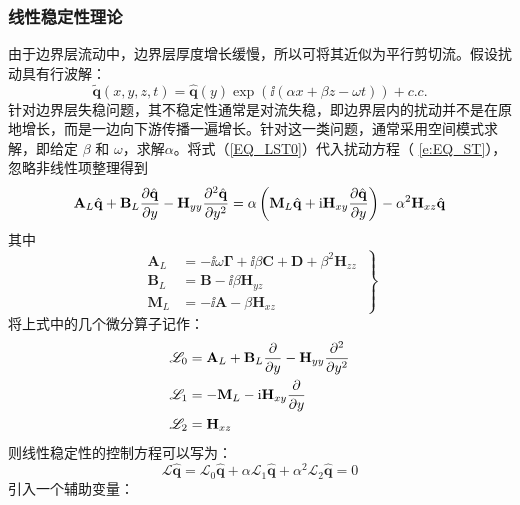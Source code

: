 \subsubsection{线性稳定性理论}
由于边界层流动中，边界层厚度增长缓慢，所以可将其近似为平行剪切流。假设扰动具有行波解：
\begin{equation}\label{EQ_LST0}
    \tilde{\mathbf{q}}(x,y,z,t)=
    \hat{\mathbf{q}}(y)\exp\left(\ii (\alpha x+\beta z-\omega t)\right)+c.c.
\end{equation}
针对边界层失稳问题，其不稳定性通常是对流失稳，即边界层内的扰动并不是在原地增长，而是一边向下游传播一遍增长。针对这一类问题，通常采用空间模式求解，即给定 $\beta$ 和 $\omega$，求解$\alpha$。将式（\ref{EQ_LST0}）代入扰动方程（ \ref{e:EQ_ST}）， 忽略非线性项整理得到
\begin{equation}\label{EQ_LST1}
\mathbf{A}_L\hat{\mathbf{q}}+
\mathbf{B}_L\frac{\partial\hat{\mathbf{q}}}{\partial y}
-\mathbf{H}_{yy}\frac{\partial^2 \hat{\mathbf{q}}}{\partial y^2}=
\alpha\left(
\mathbf{M}_L\hat{\mathbf{q}}+
\textmd{i} \mathbf{H}_{xy}\frac{\partial\hat{\mathbf{q}}}{\partial y}\right)
-\alpha^2\mathbf{H}_{xz}\hat{\mathbf{q}}
\end{equation}
其中
\begin{equation}\left.
\begin{aligned}
\mathbf{A}_L&= -\ii\omega\mathbf{\Gamma}
         +\ii\beta\mathbf{C}
         +\mathbf{D}
         +\beta^2\mathbf{H}_{zz}\\
\mathbf{B}_L&= \mathbf{B}-\ii\beta\mathbf{H}_{yz}\\
\mathbf{M}_L&= -\ii\mathbf{A}-\beta\mathbf{H}_{xz}
\end{aligned}~\right\}
\end{equation}
将上式中的几个微分算子记作：
\begin{subequations}\label{e:LST_short}
\begin{align}
  \mathscr{L}_0 &=\mathbf{A}_L+
  \mathbf{B}_L\frac{\partial}{\partial y}
  -\mathbf{H}_{yy}\frac{\partial^2 }{\partial y^2} \\
  \mathscr{L}_1 &=-\mathbf{M}_L-\textmd{i} \mathbf{H}_{xy}\frac{\partial}{\partial y}\\
  \mathscr{L}_2 &=\mathbf{H}_{xz}
\end{align}
\end{subequations}
则线性稳定性的控制方程可以写为：
\begin{equation}\label{e:LST}
  \mathscr{L}\hat{\mathbf{q}}=\mathscr{L}_0\hat{\mathbf{q}}+\alpha \mathscr{L}_1\hat{\mathbf{q}} + \alpha^2\mathscr{L}_2\hat{\mathbf{q}}=0
\end{equation}
引入一个辅助变量：
